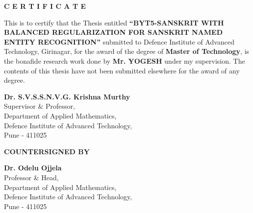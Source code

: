 \clearpage
\thispagestyle{plain}
\begin{center}
{\large\bfseries C E R T I F I C A T E}
\end{center}

\vspace{10mm}

\noindent
This is to certify that the Thesis entitled 
\textbf{``BYT5-SANSKRIT WITH BALANCED REGULARIZATION FOR SANSKRIT NAMED ENTITY RECOGNITION''} submitted to Defence Institute of Advanced Technology, Girinagar, for the award of the degree of 
\textbf{Master of Technology}, is the bonafide research work done by 
\textbf{Mr. YOGESH} under my supervision. 
The contents of this thesis have not been submitted elsewhere for the award of any degree.

\vspace{25mm}

\begin{minipage}[t]{0.55\textwidth}
    \raggedright \small
    \textbf{Dr. S.V.S.S.N.V.G. Krishna Murthy} \\[0.1cm]
    Supervisor \& Professor, \\[0.1cm]
    Department of Applied Mathematics, \\[0.1cm]
    Defence Institute of Advanced Technology, \\[0.1cm]
    Pune - 411025\\[0.1cm]
\end{minipage}
\hfill 
\begin{minipage}[t]{0.48\textwidth}
\end{minipage}

\vspace{15mm}

\begin{center}
\textbf{COUNTERSIGNED BY}
\end{center}

\vspace{25mm}

\begin{center} \textbf{Dr. Odelu Ojjela} \\ 
    Professor \& Head, \\ 
    Department of Applied Mathematics, \\ 
    Defence Institute of Advanced Technology, \\ 
    Pune - 411025 
\end{center}
\clearpage